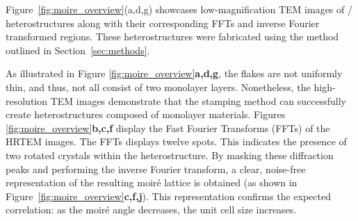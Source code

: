 Figure~\ref{fig:moire_overview}(a,d,g) showcases low-magnification TEM images of /\- heterostructures along with their corresponding FFTs and inverse Fourier transformed regions.
%
These heterostructures were fabricated using the method outlined in Section~\ref{sec:methods}. 
%

As illustrated in Figure \ref{fig:moire_overview}\textbf{a,d,g}, the flakes are not uniformly thin, and thus, not all consist of two monolayer layers.
%
Nonetheless, the high-resolution TEM images demonstrate that the stamping method can successfully create heterostructures composed of monolayer materials. 
%
Figures \ref{fig:moire_overview}\textbf{b,c,f} display the Fast Fourier Transforms (FFTs) of the HRTEM images. The FFTs displays twelve spots. This indicates the presence of two rotated crystals within the heterostructure.
%
By masking these diffraction peaks and performing the inverse Fourier transform, a clear, noise-free representation of the resulting moiré lattice is obtained (as shown in Figure~\ref{fig:moire_overview}\textbf{c,f,j}). This representation confirms the expected correlation: as the moiré angle decreases, the unit cell size increases. 

